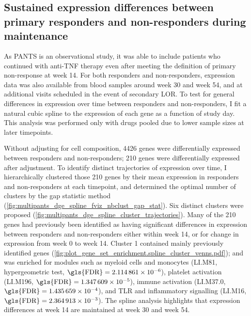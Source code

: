 \subsection{Sustained expression differences between primary responders and non-responders during maintenance}

As \gls{PANTS} is an observational study, it was able to include patients who continued with anti-\gls{TNF} therapy even after meeting the definition of primary non-response at week 14.
For both responders and non-responders, expression data was also available from blood samples around week 30 and week 54, and at additional visits scheduled in the event of secondary \gls{LOR}.
To test for general differences in expression over time between responders and non-responders,
I fit a natural cubic spline to the expression of each gene as a function of study day. 
This analysis was performed only with drugs pooled due to lower sample sizes at later timepoints.

Without adjusting for cell composition, 
\num{4426} genes were differentially expressed between responders and non-responders;
\num{210} genes were differentially expressed after adjustment.
To identify distinct trajectories of expression over time, I hierarchically clustered those \num{210} genes by their mean expression in responders and non-responders at each timepoint, 
and determined the optimal number of clusters by the gap statistic method (\cref{fig:multipants_dge_spline_fviz_nbclust_gap_stat}).
Six distinct clusters were proposed (\cref{fig:multipants_dge_spline_cluster_trajectories}).
%
Many of the \num{210} genes had previously been identified as having significant differences in expression between responders and non-responders
either within week 14, or for change in expression from week 0 to week 14.
Cluster 1 contained mainly previously identified genes (\cref{fig:plot_gene_set_enrichment.spline_cluster_venns.pdf});
and was enriched for modules such as 
myeloid cells and monocytes (LI.M81, hypergeometric test, $\text{\gls{FDR}} = \num{2.114861e-06}$),
platelet activation (LI.M196, $\text{\gls{FDR}} = \num{1.347609e-05}$),
immune activation (LI.M37.0, $\text{\gls{FDR}} = \num{1.435659e-04}$),
and TLR and inflammatory signalling (LI.M16, $\text{\gls{FDR}} = \num{2.364913e-03}$).
The spline analysis highlights that expression differences at week 14 are maintained at week 30 and week 54.

